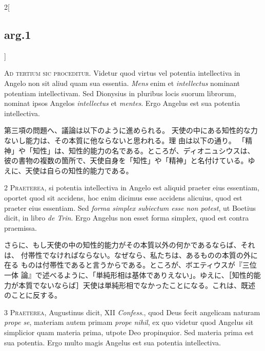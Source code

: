 \documentclass[paper=a4paper,fontsize=10pt,jafontsize=9pt,titlepage]{jlreq}
\begin{document}
\begin{paracol}{2}[\subsection{arg.1}]

{\huge A}{\scshape d tertium sic proceditur}. Videtur quod
virtus vel potentia intellectiva in Angelo non sit aliud quam sua
essentia. {\itshape Mens} enim et {\itshape intellectus} nominant potentiam intellectivam. Sed
Dionysius in pluribus locis suorum librorum, nominat ipsos Angelos
{\itshape intellectus} et {\itshape mentes}. Ergo Angelus est sua potentia intellectiva.

\switchcolumn

第三項の問題へ、議論は以下のように進められる。
天使の中にある知性的な力ないし能力は、その本質に他ならないと思われる。理
 由は以下の通り。
「精神」や「知性」は、知性的能力の名である。ところが、ディオニュシウスは、
 彼の書物の複数の箇所で、天使自身を「知性」や「精神」と名付けている。ゆ
 えに、天使は自らの知性的能力である。


{\scshape 2 Praeterea}, si potentia intellectiva in
Angelo est aliquid praeter eius essentiam, oportet quod sit accidens,
hoc enim dicimus esse accidens alicuius, quod est praeter eius
essentiam. Sed {\itshape forma simplex subiectum esse non potest}, ut Boetius
dicit, in libro {\itshape de Trin}. Ergo Angelus non esset forma simplex, quod est
contra praemissa.

\switchcolumn

さらに、もし天使の中の知性的能力がその本質以外の何かであるならば、それは、
 付帯性でなければならない。なぜなら、私たちは、あるものの本質の外に在る
 ものは付帯性であると言うからである。ところが、ボエティウスが『三位一体
 論』で述べるように、「単純形相は基体でありえない」。ゆえに、［知性的能
 力が本質でないならば］天使は単純形相でなかったことになる。これは、既述
 のことに反する。


{\scshape 3 Praeterea}, Augustinus dicit, XII {\itshape Confess}.,
quod Deus fecit angelicam naturam {\itshape prope se}, materiam autem primam {\itshape prope
nihil}, ex quo videtur quod Angelus sit simplicior quam materia prima,
utpote Deo propinquior. Sed materia prima est sua potentia. Ergo multo
magis Angelus est sua potentia intellectiva.


\end{paracol}
\end{document}
